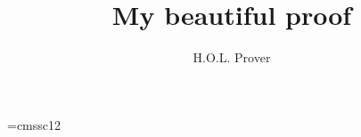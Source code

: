 

\title{My beautiful proof}
\author{H.O.L. Prover}




\font\sfc=cmssc12 \def\constfont{\sfc}


\maketitle

 


